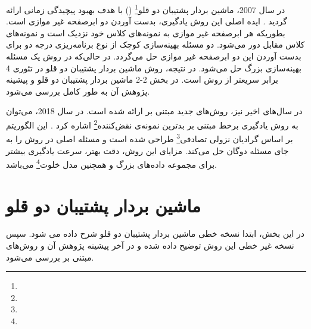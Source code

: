 در سال 2007، ماشین بردار پشتیبان دو قلو\footnote{}  () با هدف بهبود پیچیدگی زمانی  ارائه گردید \cite{jayadeva2007}. ایده اصلی این روش یادگیری، بدست آوردن دو ابرصفحه غیر موازی است. بطوریکه هر ابرصفحه غیر موازی به نمونه‌های کلاس خود نزدیک است و نمونه‌های کلاس مقابل دور می‌شود. دو مسئله بهینه‌سازی کوچک از نوع برنامه‌ریزی درجه دو برای بدست آوردن این دو ابرصفحه غیر موازی حل می‌گردد. در حالی‌که در روش  یک مسئله بهینه‌سازی بزرگ حل می‌شود. در نتیجه، روش ماشین بردار پشتیبان دو قلو در تئوری 4 برابر سریعتر از روش  است. در بخش ‏2-2 ماشین بردار پشتیبان دو قلو و پیشینه پژوهش آن به طور کامل بررسی می‌شود.

در سال‌های اخیر نیز، روش‌های جدید مبتنی بر  ارائه شده است. در سال 2018، می‌توان به روش یادگیری برخط مبتنی بر بدترین نمونه‌ی نقض‌کننده\footnote{}  اشاره کرد \cite{melki2018}. این الگوریتم بر اساس گرادیان نزولی تصادفی\footnote{}  طراحی شده است و مسئله اصلی در روش  را به جای مسئله دوگان حل می‌کند. مزایای این روش، دقت بهتر، سرعت یادگیری بیشتر برای مجموعه داده‌های بزرگ و همچنین مدل خلوت\footnote{}  می‌باشد.

\section{ماشین بردار پشتیبان دو قلو}\label{sec:2:2}
در این بخش، ابتدا نسخه خطی ماشین بردار پشتیبان دو قلو شرح داده می شود. سپس نسخه غیر خطی این روش توضیح داده شده و در آخر پیشینه پژوهش آن و روش‌های مبتنی بر  بررسی می‌شود.